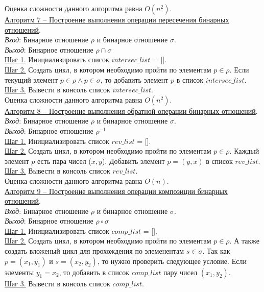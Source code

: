\documentclass[bachelor, och, labwork]{shiza}
\begin{document}
        Оценка сложности данного алгоритма равна $O(n^2)$.\\

        \underline{Алгоритм 7 -- Построение выполнения операции пересечения бинарных отношений}.\\
            \textit{Вход}: Бинарное отношение $\rho$ и бинарное отношение $\sigma$.\\
            \textit{Выход}: Бинарное отношение $\rho \cap \sigma$\\
            \underline{Шаг 1.} Инициализировать список $intersec\_list$ = []. \\
            \underline{Шаг 2.} Создать цикл, в котором необходимо пройти по элементам $p \in \rho$. Если текущий элемент $p \in \rho \wedge p \in \sigma$, то
            добавить элемент $p$ в список $intersec\_list$. \\  
            \underline{Шаг 3.} Вывести в консоль список $intersec\_list$.\\
            
        Оценка сложности данного алгоритма равна $O(n^2)$.\\

        \underline{Алгоритм 8 -- Построение выполнения обратной операции бинарных отношений}.\\
            \textit{Вход}: Бинарное отношение $\rho$ и бинарное отношение $\sigma$.\\
            \textit{Выход}: Бинарное отношение $\rho^{-1}$\\
            \underline{Шаг 1.} Инициализировать список $rev\_list$ = []. \\
            \underline{Шаг 2.} Создать цикл, в котором необходимо пройти по элементам $p \in \rho$. Каждый элемент $p$ есть пара чисел ($x, y$). Добавить 
            элемент $p = (y, x)$ в список $rev\_list$. \\  
            \underline{Шаг 3.} Вывести в консоль список $rev\_list$.\\
            
        Оценка сложности данного алгоритма равна $O(n)$.\\

        \underline{Алгоритм 9 -- Построение выполнения операции композиции бинарных отношений}.\\
            \textit{Вход}: Бинарное отношение $\rho$ и бинарное отношение $\sigma$.\\
            \textit{Выход}: Бинарное отношение $\rho \circ \sigma$\\
            \underline{Шаг 1.} Инициализировать список $comp\_list$ = []. \\
            \underline{Шаг 2.} Создать цикл, в котором необходимо пройти по элементам $p \in \rho$. А также создать вложеный цикл для прохождения по 
            элеменентам $s \in \sigma$. Так как $p = (x_1, y_1)$ и $s = (x_2, y_2)$, то нужно проверить следующее условие. Если элементы $y_1 = x_2$, то добавить
            в список $comp\_list$ пару чисел $(x_1, y_2)$.\\  
            \underline{Шаг 3.} Вывести в консоль список $comp\_list$.\\
            
\end{document}
